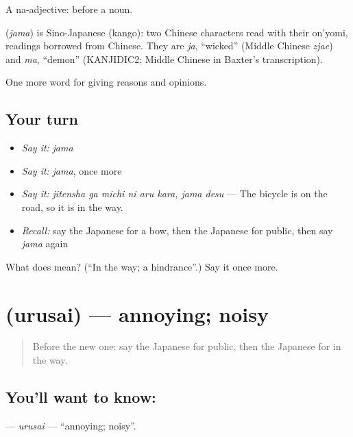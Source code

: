 A na-adjective:  before a noun.

\begin{cousinweb}
\textbf{} (\emph{jama}) is Sino-Japanese (kango): two Chinese characters read with their on'yomi, readings borrowed from Chinese. They are \emph{ja}, \textquotedblleft{}wicked\textquotedblright{} (Middle Chinese \emph{zjae}) and \emph{ma}, \textquotedblleft{}demon\textquotedblright{} (KANJIDIC2; Middle Chinese in Baxter's transcription).
\end{cousinweb}

\begin{grammarlens}[title={What you've built}]
One more word for giving reasons and opinions.
\end{grammarlens}

\subsection*{Your turn}
\begin{itemize}
\raggedright
  \item \emph{Say it:} \emph{jama}
  \item \emph{Say it:} \emph{jama}, once more
  \item \emph{Say it:} \emph{jitensha ga michi ni aru kara, jama desu} — The bicycle is on the road, so it is in the way.
  \item \emph{Recall:} say the Japanese for a bow, then the Japanese for public, then say \emph{jama} again
\end{itemize}

\begin{tcolorbox}[breakable,colback=teal!4,colframe=teal!35!black,title={Before you move on}]
What does  mean? (\textquotedblleft{}In the way; a hindrance\textquotedblright{}.) Say it once more.
\end{tcolorbox}
\section[\texorpdfstring{\ja{うるさい} (urusai)}{うるさい (urusai)}]{ (urusai) — annoying; noisy}

\label{lesson:JA-C328-urusai}



\begin{quote}
Before the new one: say the Japanese for public, then the Japanese for in the way.
\end{quote}

\subsection*{You'll want to know: }
\textbf{} — \emph{urusai} — \textquotedblleft{}annoying; noisy\textquotedblright{}.

